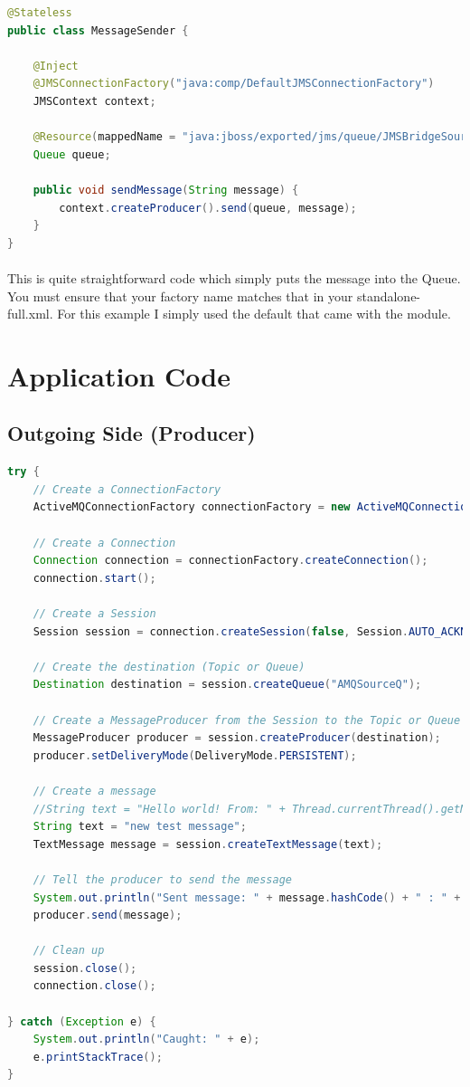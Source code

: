 \documentclass[
10pt, %
letterpaper, %
oneside, %
headinclude,footinclude, %
BCOR5mm, %
]{scrartcl}
\begin{document}
\begin{lstlisting}[language=Java]
@Stateless
public class MessageSender {

    @Inject
    @JMSConnectionFactory("java:comp/DefaultJMSConnectionFactory")
    JMSContext context;

    @Resource(mappedName = "java:jboss/exported/jms/queue/JMSBridgeSourceQ")
    Queue queue;

    public void sendMessage(String message) {
        context.createProducer().send(queue, message);
    }
}
\end{lstlisting}

\paragraph{}
This is quite straightforward code which simply puts the message into the Queue. You must ensure that your factory name matches that in your standalone-full.xml. For this example I simply used the default that came with the module.



\section{Application Code}


\subsection{\textbf{Outgoing Side (Producer)}}
\begin{lstlisting}[language=Java]
try {
	// Create a ConnectionFactory
	ActiveMQConnectionFactory connectionFactory = new ActiveMQConnectionFactory("tcp://opmq1.outsmartinc.com:61616");

	// Create a Connection
	Connection connection = connectionFactory.createConnection();
	connection.start();

	// Create a Session
	Session session = connection.createSession(false, Session.AUTO_ACKNOWLEDGE);

	// Create the destination (Topic or Queue)
	Destination destination = session.createQueue("AMQSourceQ");

	// Create a MessageProducer from the Session to the Topic or Queue
	MessageProducer producer = session.createProducer(destination);
	producer.setDeliveryMode(DeliveryMode.PERSISTENT);

	// Create a message
	//String text = "Hello world! From: " + Thread.currentThread().getName() + " : " + this.hashCode();
	String text = "new test message";
	TextMessage message = session.createTextMessage(text);

	// Tell the producer to send the message
	System.out.println("Sent message: " + message.hashCode() + " : " + Thread.currentThread().getName());
	producer.send(message);

	// Clean up
	session.close();
	connection.close();
	
} catch (Exception e) {
	System.out.println("Caught: " + e);
	e.printStackTrace();
}
\end{lstlisting}
\end{document}

